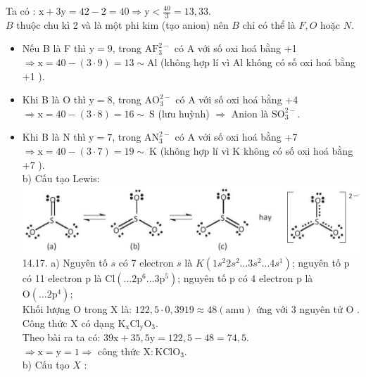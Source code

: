 \documentclass[10pt]{article}
\begin{document}
Ta có : $\mathrm{x}+3 \mathrm{y}=42-2=40 \Rightarrow \mathrm{y}<\frac{40}{3}=13,33$.\\
$B$ thuộc chu kì 2 và là một phi kim (tạo anion) nên $B$ chỉ có thể là $F, O$ hoặc $N$.

\begin{itemize}
  \item Nếu B là F thì $\mathrm{y}=9$, trong $\mathrm{AF}_{3}^{2-}$ có A với số oxi hoá bằng +1\\
$\Rightarrow \mathrm{x}=40-(3 \cdot 9)=13 \sim \mathrm{Al}$ (không hợp lí vì Al không có số oxi hoá bằng +1 ).
  \item Khi B là O thì $\mathrm{y}=8$, trong $\mathrm{AO}_{3}^{2-}$ có A với số oxi hoá bằng +4\\
$\Rightarrow \mathrm{x}=40-(3 \cdot 8)=16 \sim \mathrm{~S}$ (lưu huỳnh) $\Rightarrow$ Anion là $\mathrm{SO}_{3}^{2-}$.
  \item Khi B là N thì $\mathrm{y}=7$, trong $\mathrm{AN}_{3}^{2-}$ có A với số oxi hoá bằng +7\\
$\Rightarrow \mathrm{x}=40-(3 \cdot 7)=19 \sim \mathrm{~K}$ (không hợp lí vì K không có số oxi hoá bằng +7 ).\\
b) Cấu tạo Lewis:\\
\includegraphics[max width=\textwidth, center]{2025_10_23_ee735750217b2aca435cg-31(1)}\\
14.17. a) Nguyên tố $s$ có 7 electron $s$ là $K\left(1 s^{2} 2 s^{2} \ldots 3 s^{2} \ldots 4 s^{1}\right)$; nguyên tố p có 11 electron p là $\mathrm{Cl}\left(\ldots 2 \mathrm{p}^{6} \ldots 3 \mathrm{p}^{5}\right)$; nguyên tố p có 4 electron p là $\mathrm{O}\left(\ldots 2 \mathrm{p}^{4}\right)$;\\
Khối lượng O trong X là: $122,5 \cdot 0,3919 \approx 48(\mathrm{amu})$ ứng với 3 nguyên tử O .\\
Công thức X có dạng $\mathrm{K}_{\mathrm{x}} \mathrm{Cl}_{\mathrm{y}} \mathrm{O}_{3}$.\\
Theo bài ra ta có: $39 \mathrm{x}+35,5 \mathrm{y}=122,5-48=74,5$.\\
$\Rightarrow \mathrm{x}=\mathrm{y}=1 \Rightarrow$ công thức $\mathrm{X}: \mathrm{KClO}_{3}$.\\
b) Cấu tạo $X$ :\\

\end{itemize}
\end{document}
